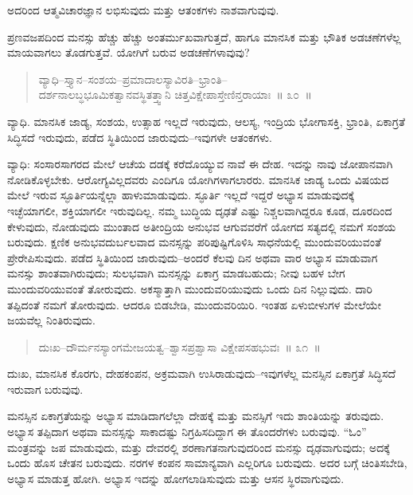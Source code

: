ಅದರಿಂದ ಆತ್ಮವಿಚಾರಜ್ಞಾನ ಲಭಿಸುವುದು ಮತ್ತು ಆತಂಕಗಳು ನಾಶವಾಗುವುವು. 

ಪ್ರಣವಜಪದಿಂದ ಮನಸ್ಸು ಹೆಚ್ಚು ಹೆಚ್ಚು ಅಂತರ್ಮುಖವಾಗುತ್ತದೆ, ಹಾಗೂ ಮಾನಸಿಕ ಮತ್ತು ಭೌತಿಕ ಅಡಚಣೆಗಳೆಲ್ಲ ಮಾಯವಾಗಲು ತೊಡಗುತ್ತವೆ. ಯೋಗಿಗೆ ಬರುವ ಅಡಚಣೆಗಳಾವುವು?

\vspace{-0.3cm}

\begin{verse}
ವ್ಯಾಧಿ–ಸ್ತ್ಯಾನ–ಸಂಶಯ–ಪ್ರಮಾದಾಲಸ್ಯಾವಿರತಿ–ಭ್ರಾಂತಿ–\\ದರ್ಶನಾಲಬ್ಧಭೂಮಿಕತ್ವಾನವಸ್ಥಿತತ್ತ್ವಾನಿ ಚಿತ್ತವಿಕ್ಷೇಪಾಸ್ತೇಣಿನ್ತರಾಯಾಃ~॥ ೩೦~॥
\end{verse}

\vspace{-0.3cm}

ವ್ಯಾಧಿ. ಮಾನಸಿಕ ಜಾಡ್ಯ, ಸಂಶಯ, ಉತ್ಸಾಹ ಇಲ್ಲದೆ ಇರುವುದು, ಆಲಸ್ಯ, ಇಂದ್ರಿಯ ಭೋಗಾಸಕ್ತಿ, ಭ್ರಾಂತಿ, ಏಕಾಗ್ರತೆ ಸಿದ್ಧಿಸದೆ ಇರುವುದು, ಪಡೆದ ಸ್ಥಿತಿಯಿಂದ ಜಾರುವುದು–ಇವುಗಳೇ ಆತಂಕಗಳು. 

ವ್ಯಾಧಿ: ಸಂಸಾರಸಾಗರದ ಮೇಲೆ ಆಚೆಯ ದಡಕ್ಕೆ ಕರೆದೊಯ್ಯುವ ನಾವೆ ಈ ದೇಹ. ಇದನ್ನು ನಾವು ಜೋಪಾನವಾಗಿ ನೋಡಿಕೊಳ್ಳಬೇಕು. ಆರೋಗ್ಯವಿಲ್ಲದವರು ಎಂದಿಗೂ ಯೋಗಿಗಳಾಗಲಾರರು. ಮಾನಸಿಕ ಜಾಡ್ಯ ಒಂದು ವಿಷಯದ ಮೇಲೆ ಇರುವ ಸ್ಫೂರ್ತಿಯನ್ನೆಲ್ಲಾ ಹಾಳುಮಾಡುವುದು. ಸ್ಫೂರ್ತಿ ಇಲ್ಲದೆ ಇದ್ದರೆ ಅಭ್ಯಾಸ ಮಾಡುವುದಕ್ಕೆ ಇಚ್ಛೆಯಾಗಲೀ, ಶಕ್ತಿಯಾಗಲೀ ಇರುವುದಿಲ್ಲ. ನಮ್ಮ ಬುದ್ಧಿಯ ದೃಢತೆ ಎಷ್ಟು ನಿಶ್ಚಲವಾಗಿದ್ದರೂ ಕೂಡ, ದೂರದಿಂದ ಕೇಳುವುದು, ನೋಡುವುದು ಮುಂತಾದ ಅತೀಂದ್ರಿಯ ಅನುಭವ ಆಗುವವರೆಗೆ ಯೋಗದ ಸತ್ಯದಲ್ಲಿ ನಮಗೆ ಸಂಶಯ ಬರುವುದು. ಕ್ಷಣಿಕ ಅನುಭವ\break ದುರ್ಬಲವಾದ ಮನಸ್ಸನ್ನು ಪರಿಪುಷ್ಟಿಗೊಳಿಸಿ ಸಾಧನೆಯಲ್ಲಿ ಮುಂದುವರಿಯುವಂತೆ ಪ್ರೇರೇಪಿಸುವುದು. ಪಡೆದ ಸ್ಥಿತಿಯಿಂದ ಜಾರುವುದು–ಅಂದರೆ ಕೆಲವು ದಿನ ಅಥವಾ ವಾರ ಅಭ್ಯಾಸ ಮಾಡುವಾಗ ಮನಸ್ಸು ಶಾಂತವಾಗಿರುವುದು; ಸುಲಭವಾಗಿ ಮನಸ್ಸನ್ನು ಏಕಾಗ್ರ ಮಾಡಬಹುದು; ನೀವು ಬಹಳ ಬೇಗ ಮುಂದುವರಿಯುವಂತೆ ತೋರುವುದು. ಅಕಸ್ಮಾತ್ತಾಗಿ ಮುಂದುವರಿಯುವುದು ಒಂದು ದಿನ ನಿಲ್ಲುವುದು. ದಾರಿ ತಪ್ಪಿದಂತೆ ನಮಗೆ ತೋರುವುದು. ಆದರೂ ಬಿಡಬೇಡಿ, ಮುಂದುವರಿಯಿರಿ. ಇಂತಹ ಏಳುಬೀಳುಗಳ ಮೇಲೆಯೇ ಜಯವೆಲ್ಲ ನಿಂತಿರುವುದು. 

\vspace{-0.3cm}

\begin{verse}
ದುಃಖ–ದೌರ್ಮನಸ್ಯಾಂಗಮೇಜಯತ್ವ–ಶ್ವಾಸಪ್ರಶ್ವಾಸಾ ವಿಕ್ಷೇಪಸಹಭುವಃ~॥ ೩೧~॥
\end{verse}

\vspace{-0.3cm}

ದುಃಖ, ಮಾನಸಿಕ ಕೊರಗು, ದೇಹಕಂಪನ, ಅಕ್ರಮವಾಗಿ ಉಸಿರಾಡುವುದು–ಇವುಗಳೆಲ್ಲ ಮನಸ್ಸಿನ ಏಕಾಗ್ರತೆ ಸಿದ್ಧಿಸದೆ ಇರುವಾಗ ಬರುವುವು. 

ಮನಸ್ಸಿನ ಏಕಾಗ್ರತೆಯನ್ನು ಅಭ್ಯಾಸ ಮಾಡಿದಾಗಲೆಲ್ಲಾ ದೇಹಕ್ಕೆ ಮತ್ತು ಮನಸ್ಸಿಗೆ ಇದು ಶಾಂತಿಯನ್ನು ತರುವುದು. ಅಭ್ಯಾಸ ತಪ್ಪಿದಾಗ ಅಥವಾ ಮನಸ್ಸನ್ನು ಸಾಕಾದಷ್ಟು ನಿಗ್ರಹಿಸದಿದ್ದಾಗ ಈ ತೊಂದರೆಗಳು ಬರುವುವು. “ಓಂ” ಮಂತ್ರವನ್ನು ಜಪ ಮಾಡುವುದು, ಮತ್ತು ದೇವರಲ್ಲಿ ಶರಣಾಗತನಾಗುವುದರಿಂದ ಮನಸ್ಸು ದೃಢವಾಗುವುದು; ಅದಕ್ಕೆ ಒಂದು ಹೊಸ ಚೇತನ ಬರುವುದು. ನರಗಳ ಕಂಪನ ಸಾಮಾನ್ಯವಾಗಿ ಎಲ್ಲರಿಗೂ ಬರುವುದು. ಅದರ ಬಗ್ಗೆ ಚಿಂತಿಸಬೇಡಿ, ಅಭ್ಯಾಸ ಮಾಡುತ್ತ ಹೋಗಿ. ಅಭ್ಯಾಸ ಇದನ್ನು ಹೋಗಲಾಡಿಸುವುದು ಮತ್ತು ಆಸನ ಸ್ಥಿರವಾಗುವುದು. 

